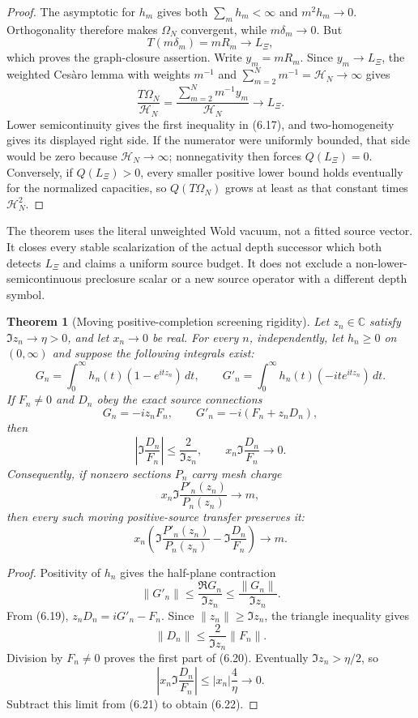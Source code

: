 \documentclass[11pt]{article}
\newtheorem{theorem}{Theorem}[section]
\theoremstyle{definition}
\theoremstyle{remark}
\newcommand{\C}{\mathbb C}
\begin{document}
\begin{proof}
The asymptotic for $h_m$ gives both $\sum_mh_m<\infty$ and
$m^2h_m\to0$.  Orthogonality therefore makes $\Omega_N$ convergent, while
$m\delta_m\to0$.  But
\[
 T(m\delta_m)=mR_m\longrightarrow L_\Xi,
\]
which proves the graph-closure assertion.  Write $y_m=mR_m$.  Since $y_m\to L_\Xi$,
the weighted Ces\`aro lemma with weights $m^{-1}$ and
$\sum_{m=2}^Nm^{-1}={\mathcal H}_N\to\infty$ gives
\[
 \frac{T\Omega_N}{{\mathcal H}_N}
 =\frac{\sum_{m=2}^Nm^{-1}y_m}{{\mathcal H}_N}
 \longrightarrow L_\Xi.
\]
Lower semicontinuity gives the first inequality in (6.17), and two-homogeneity gives its
displayed right side.  If the numerator were uniformly bounded, that side would be zero because
${\mathcal H}_N\to\infty$; nonnegativity then forces $Q(L_\Xi)=0$.  Conversely, if
$Q(L_\Xi)>0$, every smaller positive lower bound holds eventually for the normalized capacities,
so $Q(T\Omega_N)$ grows at least as that constant times ${\mathcal H}_N^2$.
\end{proof}

The theorem uses the literal unweighted Wold vacuum, not a fitted source vector.  It closes every
stable scalarization of the actual depth successor which both detects $L_\Xi$ and claims a
uniform source budget.  It does not exclude a non-lower-semicontinuous preclosure scalar or a new
source operator with a different depth symbol.

\begin{theorem}[Moving positive-completion screening rigidity]
\label{thm:moving-positive-gauge}
Let $z_n\in\C$ satisfy $\Im z_n\to\eta>0$, and let $x_n\to0$ be real.  For every
$n$, independently, let $h_n\geq0$ on $(0,\infty)$ and suppose the following integrals exist:
\[
 G_n=\int_0^\infty h_n(t)(1-e^{itz_n})\,dt,\qquad
 G'_n=\int_0^\infty h_n(t)(-it e^{itz_n})\,dt.
 \tag{6.18}
\]
If $F_n\ne0$ and $D_n$ obey the exact source connections
\[
 G_n=-iz_nF_n,\qquad G'_n=-i(F_n+z_nD_n),
 \tag{6.19}
\]
then
\[
 \left|\Im\frac{D_n}{F_n}\right|\leq\frac2{\Im z_n},
 \qquad
 x_n\Im\frac{D_n}{F_n}\longrightarrow0.
 \tag{6.20}
\]
Consequently, if nonzero sections $P_n$ carry mesh charge
\[
 x_n\Im\frac{P'_n(z_n)}{P_n(z_n)}\longrightarrow m,
 \tag{6.21}
\]
then every such moving positive-source transfer preserves it:
\[
 x_n\left(
 \Im\frac{P'_n(z_n)}{P_n(z_n)}-\Im\frac{D_n}{F_n}
 \right)\longrightarrow m.
 \tag{6.22}
\]
\end{theorem}

\begin{proof}
Positivity of $h_n$ gives the half-plane contraction
\[
 \|G'_n\|\leq\frac{\Re G_n}{\Im z_n}
 \leq\frac{\|G_n\|}{\Im z_n}.
\]
From (6.19), $z_nD_n=iG'_n-F_n$.  Since
$\|z_n\|\geq\Im z_n$, the triangle inequality gives
\[
 \|D_n\|\leq\frac2{\Im z_n}\|F_n\|.
\]
Division by $F_n\ne0$ proves the first part of (6.20).  Eventually
$\Im z_n>\eta/2$, so
\[
 \left|x_n\Im\frac{D_n}{F_n}\right|
 \leq |x_n|\frac4\eta\longrightarrow0.
\]
Subtract this limit from (6.21) to obtain (6.22).
\end{proof}
\end{document}

